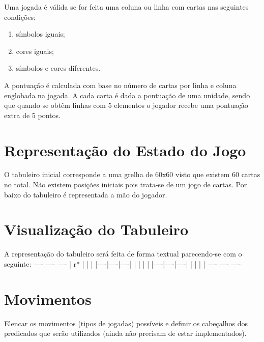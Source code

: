 \documentclass[a4paper]{article}
\begin{document}
Uma jogada é válida se for feita uma coluna ou linha com cartas nas seguintes condições:

\begin{enumerate}
	\item símbolos iguais;
	\item cores iguais;
	\item símbolos e cores diferentes.
\end{enumerate}

A pontuação é calculada com base no número de cartas por linha e coluna englobada na jogada. A cada carta é dada a pontuação de uma unidade, sendo que quando se obtêm linhas com 5 elementos o jogador recebe uma pontuação extra de 5 pontos. 

\section{Representação do Estado do Jogo}

O tabuleiro inicial corresponde a uma grelha de 60x60 visto que existem 60 cartas no total. Não existem posições iniciais pois trata-se de um jogo de cartas. Por baixo do tabuleiro é representada a mão do jogador. 

\section{Visualização do Tabuleiro}

A representação do tabuleiro será feita de forma textual parecendo-se com o seguinte: \linebreak ---- ---- ---- \linebreak
| r* |    |    | \linebreak
|----|----|----| \linebreak
|    |    |    | \linebreak
|----|----|----| \linebreak
|    |    |    | \linebreak
 ---- ---- ----  \linebreak
\linebreak


\section{Movimentos}

Elencar os movimentos (tipos de jogadas) possíveis e definir os cabeçalhos dos predicados que serão utilizados (ainda não precisam de estar implementados).
\end{document}
